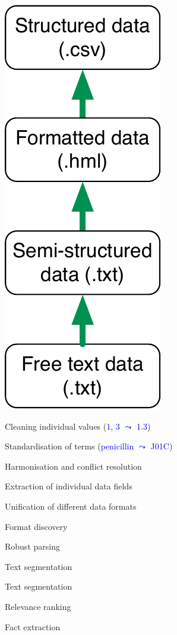 \documentclass[landscape,footrule]{foils}
\begin{document}
\includegraphics[scale=1.0, trim= 0cm -0.25cm 0cm 0cm, clip]{nlp-tasks}\hspace*{0.5cm}
\begin{minipage}[b]{16cm}
\begin{triangles}
\item Cleaning individual values (\textcolor{blue}{1, 3 $\leadsto$ 1.3})
\item Standardisation of terms (\textcolor{blue}{penicillin $\leadsto$ J01C})
\item Harmonisation and conflict resolution
\end{triangles}\vspace*{3ex}
\begin{triangles}
\item Extraction of individual data fields
\item Unification of different data formats
\end{triangles}\vspace*{3ex}
\begin{triangles}
\item Format discovery
\item Robust parsing 
\item Text segmentation
\end{triangles}
\vspace*{3ex}
\begin{triangles}
\item Text segmentation
\item Relevance ranking
\item Fact extraction
\end{triangles}
\end{minipage}
\end{document}
